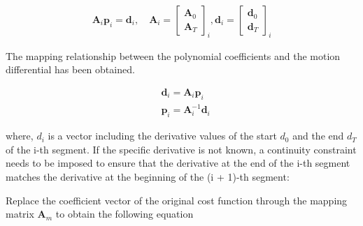 \documentclass[times,authoryear]{elsarticle}
\begin{document}
\begin{equation}
	\begin{align}
		\boldsymbol{A}_i\boldsymbol{p}_i=\boldsymbol{d}_i,\quad \boldsymbol{A}_i=\begin{bmatrix}\boldsymbol{A}_0\\\boldsymbol{A}_T\end{bmatrix}_i,\boldsymbol{d}_i=\begin{bmatrix}\boldsymbol{d}_0\\\boldsymbol{d}_T\end{bmatrix}_i
	\end{align}
\end{equation}

The mapping relationship between the polynomial coefficients and the motion differential has been obtained.

\begin{equation}
	\begin{align}
		& \boldsymbol{d}_{i}
		= 
		\boldsymbol{A}_{i} 
		\boldsymbol{p}_{i} \\
		& \boldsymbol{p}_{i} = \boldsymbol{A}_{i}^{-1}\boldsymbol{d}_{i}
	\end{align}
\end{equation}

where, $d_{i}$ is a vector including the derivative values of the start $d_0$ and the end $d_T$ of the i-th segment. If the specific derivative is not known, a continuity constraint needs to be imposed to ensure that the derivative at the end of the i-th segment matches the derivative at the beginning of the (i + 1)-th segment: 

Replace the coefficient vector of the original cost function through the mapping matrix $\boldsymbol{A}_{m}$ to obtain the following equation
\end{document}
